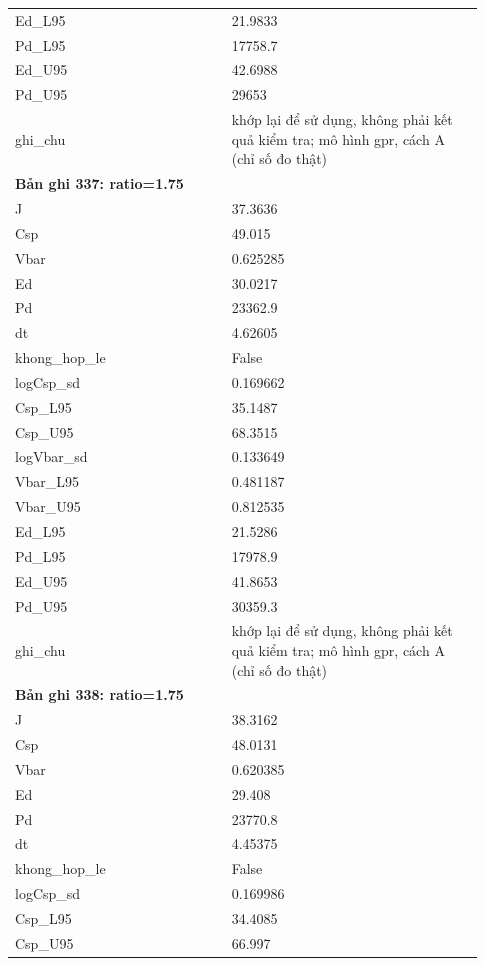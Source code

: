 \begin{longtable}{p{0.43\linewidth}p{0.50\linewidth}}
Ed\_\allowbreak L95 & 21.9833 \\
Pd\_\allowbreak L95 & 17758.7 \\
Ed\_\allowbreak U95 & 42.6988 \\
Pd\_\allowbreak U95 & 29653 \\
ghi\_\allowbreak chu & khớp lại để sử dụng, không phải kết quả kiểm tra; mô hình gpr, cách A (chỉ số đo thật) \\
\midrule
\multicolumn{2}{p{0.95\linewidth}}{\textbf{Bản ghi 337: ratio=1.75}} \\
J & 37.3636 \\
Csp & 49.015 \\
Vbar & 0.625285 \\
Ed & 30.0217 \\
Pd & 23362.9 \\
dt & 4.62605 \\
khong\_\allowbreak hop\_\allowbreak le & False \\
logCsp\_\allowbreak sd & 0.169662 \\
Csp\_\allowbreak L95 & 35.1487 \\
Csp\_\allowbreak U95 & 68.3515 \\
logVbar\_\allowbreak sd & 0.133649 \\
Vbar\_\allowbreak L95 & 0.481187 \\
Vbar\_\allowbreak U95 & 0.812535 \\
Ed\_\allowbreak L95 & 21.5286 \\
Pd\_\allowbreak L95 & 17978.9 \\
Ed\_\allowbreak U95 & 41.8653 \\
Pd\_\allowbreak U95 & 30359.3 \\
ghi\_\allowbreak chu & khớp lại để sử dụng, không phải kết quả kiểm tra; mô hình gpr, cách A (chỉ số đo thật) \\
\midrule
\multicolumn{2}{p{0.95\linewidth}}{\textbf{Bản ghi 338: ratio=1.75}} \\
J & 38.3162 \\
Csp & 48.0131 \\
Vbar & 0.620385 \\
Ed & 29.408 \\
Pd & 23770.8 \\
dt & 4.45375 \\
khong\_\allowbreak hop\_\allowbreak le & False \\
logCsp\_\allowbreak sd & 0.169986 \\
Csp\_\allowbreak L95 & 34.4085 \\
Csp\_\allowbreak U95 & 66.997 \\

\end{longtable}
